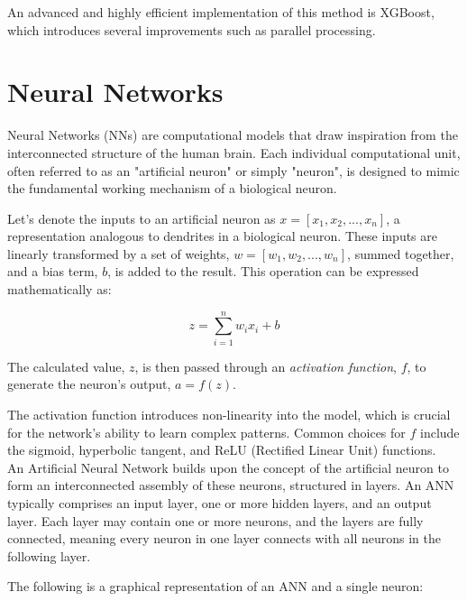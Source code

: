 An advanced and highly efficient implementation of this method is XGBoost, which introduces several improvements such as parallel processing.


\section{Neural Networks}
Neural Networks (NNs) are computational models that draw inspiration from the interconnected structure of the human brain. Each individual computational unit, often referred to as an "artificial neuron" or simply "neuron", is designed to mimic the fundamental working mechanism of a biological neuron.

Let's denote the inputs to an artificial neuron as $ x = [x_1, x_2, ..., x_n] $, a representation analogous to dendrites in a biological neuron. These inputs are linearly transformed by a set of weights, $ w = [w_1, w_2, ..., w_n] $, summed together, and a bias term, $ b $, is added to the result. This operation can be expressed mathematically as:

\[
z = \sum_{i=1}^{n} w_i x_i + b 
\]

The calculated value, $ z $, is then passed through an \textit{activation function}, $ f $, to generate the neuron's output, $ a = f(z) $.


The activation function introduces non-linearity into the model, which is crucial for the network's ability to learn complex patterns. Common choices for $ f $ include the sigmoid, hyperbolic tangent, and ReLU (Rectified Linear Unit) functions.\\

An Artificial Neural Network builds upon the concept of the artificial neuron to form an interconnected assembly of these neurons, structured in layers. An ANN typically comprises an input layer, one or more hidden layers, and an output layer. Each layer may contain one or more neurons, and the layers are fully connected, meaning every neuron in one layer connects with all neurons in the following layer.

The following is a graphical representation of an ANN and a single neuron:


